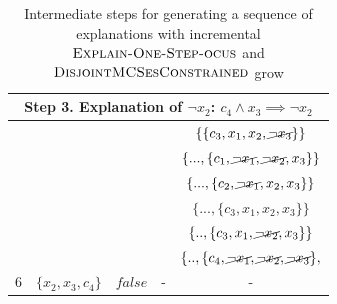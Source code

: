\documentclass[twoside,11pt]{article}
\newcommand\mm[1]{\ensuremath{#1}\xspace}
\newcommand\call[1]{\mm{\textsc{#1}}}
\newcommand\disjmcsconstrained{\mm{\call{DisjointMCSesConstrained}\xspace}}
\newcommand\onestepo{\ensuremath{\call{Explain-One-Step-ocus}} \xspace}
\begin{document}
\begin{table}[!h]
\begin{tabular}{lcccc}
	\\
	\multicolumn{5}{c}{Step 3. Explanation of $\lnot x_2$: $c_4 \wedge x_3 \implies \lnot x_2$}\\
	\toprule[2pt]
	  &  &  &   &   $\{ \{c_3, x_1, {x_2}, \cancel{\lnot x_3} \}\}$                                                               \\
 &  & &  & $\{ ..., \{ c_1, \cancel{\lnot x_1}, \cancel{\lnot x_2}, x_3 \}\}$\\
&  & &   &   $\{  ..., \{c_2, \cancel{\lnot x_1} , {x_2}, x_3 \} \}$       \\
&  & &   &  $\{ ..., \{ c_3, x_1, {x_2}, x_3\} \}$         \\
&  & &   &  $\{  .., \{ c_3, x_1, \cancel{\lnot x_2}, {x_3  }\} \}$\\
&  & &   & $\{  .., \{ c_4 , \cancel{\lnot x_1}, \cancel{\lnot x_2}, \cancel{\lnot x_3} \},$\\
	6                    & $\{ x_2 , x_3, c_4 \}$              & $\mathit{false}$ & -                                                      & -                                                                       \\
\end{tabular}
\caption{Intermediate steps for generating a sequence of explanations with incremental \onestepo and \disjmcsconstrained grow}
\label{tab:explanation-steps-expanded:step1}
\end{table}
\end{document}
